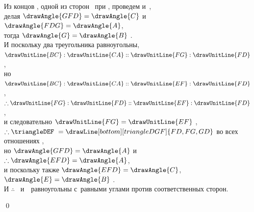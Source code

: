 \documentclass[letters,booklanguage=russian]{byrnebook}
\begin{document}
\begin{center}
Из концов , одной из сторон \triangleDEF\ при , проведем  и~,\\
делая $\drawAngle{GFD} = \drawAngle{C}$ и~$\drawAngle{FDG} = \drawAngle{A}$,\\
тогда $\drawAngle{G} = \drawAngle{B}$ .\\
И поскольку два треугольника равноугольны,\\
$\drawUnitLine{BC} : \drawUnitLine{CA} :: \drawUnitLine{FG} : \drawUnitLine{FD}$ ,\\
но $\drawUnitLine{BC} : \drawUnitLine{CA} :: \drawUnitLine{EF} : \drawUnitLine{FD}$ \byref{\hypref},
$\therefore \drawUnitLine{FG} : \drawUnitLine{FD} :: \drawUnitLine{EF} : \drawUnitLine{FD}$ ,\\
и следовательно $\drawUnitLine{FG} = \drawUnitLine{EF}$ ,\\
$\therefore \triangleDEF\ =
\drawLine[bottom][triangleDGF]{FD,FG,GD}$ во всех отношениях ,\\
но $\drawAngle{GFD} = \drawAngle{A}$ \byref{\constref} и~$\therefore \drawAngle{EFD} = \drawAngle{A}$,\\
и поскольку также $\drawAngle{EFD} = \drawAngle{C}$,\\
$\drawAngle{E} = \drawAngle{B}$ .\\
И $\therefore$ \triangleABC\ и~\triangleDEF\ равноугольны с~равными углами против соответственных сторон.
\end{center}

\qed
\end{document}
